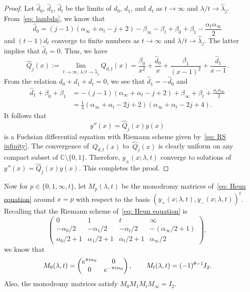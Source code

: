 \documentclass[11pt]{article}
\numberwithin{equation}{section}
\numberwithin{equation}{section}
\def\C{\mathbb C}
\def\M#1#2#3#4{\begin{pmatrix}#1&#2\\#3&#4\end{pmatrix}}
\begin{document}
\begin{proof} Let $\hat d_0$, $\hat d_1$, $\hat d_t$ be the limits of $d_0$,
 $d_1$, and $d_t$ as $t\to\infty$ and $\lambda/t\to\hat\lambda_j$.
 From~\eqref{eq: lambda}, we know that
\[
 \hat d_0=(j-1)(\alpha_\infty+\alpha_t-j+2)
 -\beta_\infty-\beta_t+\beta_0+\beta_1-\frac{\alpha_t\alpha_\infty}2
\]
 and $(t-1)d_t$ converge to finite numbers as $t\to\infty$ and
 $\lambda/t\to\hat\lambda_j$. The latter implies that
 $\hat d_t=0$. Thus, we have
\[
 \hat Q_j(x):=\lim_{t\to\infty,\,\lambda/t\to\hat\lambda_j}Q_{d,t}(x)
 =\frac{\beta_0}{x^2}+\frac{\hat d_0}x
 +\frac{\beta_1}{(x-1)^2}+\frac{\hat d_1}{x-1}.
\]
 From the relation $d_0+d_1+d_t=0$, we see that $\hat d_1=-\hat d_0$
 and
 \begin{equation*}
 \begin{split}
 \hat d_1+\beta_0+\beta_1
 &{}=-(j-1)(\alpha_\infty+\alpha_t-j+2)+\beta_\infty+\beta_t
 +\frac{\alpha_t\alpha_\infty}2 \\
 &{}=\frac14(\alpha_\infty+\alpha_t-2j+2)
 (\alpha_\infty+\alpha_t-2j+4).
 \end{split}
 \end{equation*}
 It follows that
\[
 y''(x)=\hat Q_j(x)y(x)
\]
 is a Fuchsian differential equation with Riemann scheme
 given by~\eqref{eq: RS infinity}. The convergence of~$Q_{d,t}(x)$ to~$\hat Q_j(x)$ is clearly uniform on any compact subset of ${\C\setminus\{0,1\}}$.
 Therefore, $y_\pm(x;\lambda,t)$ converge to solutions of
 $y''(x)=\hat Q_j(x)y(x)$. This completes the proof.
\end{proof}

Now for $p\in\{0,1,\infty,t\}$, let $M_p(\lambda,t)$ be the monodromy
matrices of~\eqref{eq: Heun equation} around $x=p$ with respect to the
basis $(y_+(x;\lambda,t),y_-(x;\lambda,t))^t$.
Recalling that the Riemann scheme of~\eqref{eq: Heun equation} is
\[
\begin{pmatrix}
 0 & 1 & t & \infty \\
 -\alpha_0/2 & -\alpha_1/2 & -\alpha_t/2 & -(\alpha_\infty/2+1) \\
 \alpha_0/2+1 & \alpha_1/2+1 & \alpha_t/2+1 & \alpha_\infty/2
\end{pmatrix},
\]
we know that
\[
M_0(\lambda,t)=\M{{\rm e}^{\pi {\rm i}\alpha_0}}00{{\rm e}^{-\pi {\rm i}\alpha_0}}, \qquad
M_t(\lambda,t)=(-1)^{\theta-1}I_2.
\]
Also, the monodromy matrices satisfy $M_0M_1M_tM_\infty=I_2$.
\end{document}
